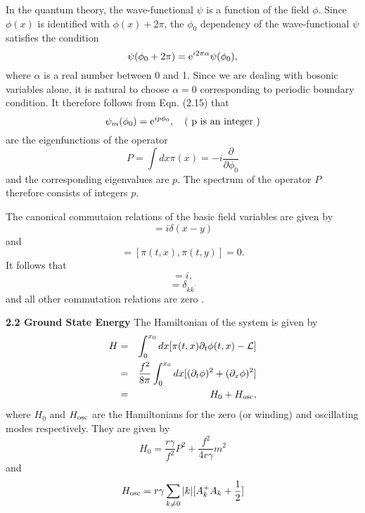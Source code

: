 \documentclass[a4paper,12pt]{article}
\begin{document}
In the quantum theory, 
the wave-functional $\psi$ is a function of the field $\phi$.
Since $\phi(x)$ is identified with $\phi(x) + 2 \pi$, the $\phi_0$
dependency of the wave-functional $\psi$ satisfies the condition
\begin{equation}
\psi (\phi_0 + 2 \pi) = {\rm e}^{i 2 \pi \alpha} \psi (\phi_0),
\end{equation}
where $\alpha$ is a real number between 0 and 1. Since we are dealing with
bosonic variables alone, it is natural to choose $\alpha = 0$ corresponding
to periodic boundary condition. It therefore follows from Eqn. (2.15) that
\begin{equation}
\psi_m (\phi_0) = {\rm e}^{i p \phi_0},~~~ {\rm (~p~ is~ an~ integer~)}
\end{equation}
are the eigenfunctions of the operator 
\begin{equation}
P = \int dx \pi (x) = -i \frac{\partial}{\partial \phi_0}
\end{equation}
and the corresponding eigenvalues are $p$.
The spectrum of the operator $P$ therefore consists of integers $p$.

The canonical commutaion relations of the basic field variables are given by
\begin{equation}
[{\phi}(t,x),{\pi}(t,y)]=i{\delta}(x-y)
\end{equation}
and
\begin{equation}
[{\phi}(t,x),{\phi}(t,y)]=[{\pi}(t,x),{\pi}(t,y)]=0.
\end{equation}
It follows that
\begin{equation}
[Q,P]=i,
\end{equation}
\begin{equation}
[A_k,{A_k^{'}}^{+}]={\delta}_{k k^{'}}
\end{equation}
and all other commutation relations are zero .

\vskip 5mm
\noindent
{\bf 2.2 Ground State Energy}
\vskip 5mm
\noindent
The Hamiltonian of the system is given by
\begin{eqnarray}
H&=&\int_{0}^{x_0} dx [ {\pi}(t,x){\partial}_{t}{\phi}(t,x) -
{\cal L} ]\nonumber\\
&=&\frac{f^2}{8{\pi}}\int_{0}^{x_0} dx 
[ ({\partial}_{t}{\phi})^2 +({\partial}_{x}{\phi})^2]\nonumber\\
&=&H_0 + H_{\rm osc} ,\nonumber\\
\end{eqnarray}
where $H_0$ and $H_{\rm osc}$ are the 
Hamiltonians for the zero (or winding) and oscillating
modes respectively. They are given by
\begin{equation}    
H_0= \frac{r{\gamma}}{f^2} P^2 + \frac{f^2}{4r{\gamma}} m^2
\end{equation} 
and
\begin{equation}
H_{\rm osc}=r{\gamma} \sum_{k{\neq}0} |k| [ A_k^{+}A_{k} 
+\frac{1}{2}]
\end{equation}
\end{document}
